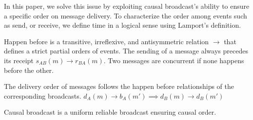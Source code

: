 In this paper, we solve this issue by exploiting causal broadcast's ability to
ensure a specific order on message delivery. To characterize the order among
events such as send, or receive, we define time in a logical sense using
Lamport’s definition.

\begin{definition}
  Happen before is a transitive, irreflexive, and antisymmetric relation
  $\rightarrow$ that defines a strict partial orders of events. The sending of a
  message always precedes its receipt $s_{AB}(m) \rightarrow r_{BA}(m)$. Two
  messages are concurrent if none happens before the other.
\end{definition}

\begin{definition}
  The delivery order of messages follows the happen before relationships of the
  corresponding broadcasts.
  $d_A(m) \rightarrow b_A(m') \implies d_B(m) \rightarrow d_B(m')$
\end{definition}

\begin{definition}
  Causal broadcast is a uniform reliable broadcast ensuring causal order.
\end{definition}

%     


